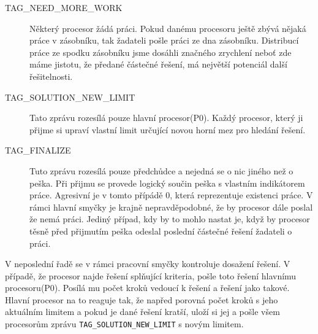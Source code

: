 \documentclass[12pt]{article}
\begin{document}
\begin{description}
  \item [TAG\_NEED\_MORE\_WORK] Některý procesor žádá práci. Pokud danému 
procesoru ještě zbývá nějaká práce v zásobníku, tak žadateli pošle práci ze 
dna zásobníku. Distribucí práce ze spodku zásobníku jsme dosáhli značného 
zrychlení neboť zde máme jistotu, že předané částečné řešení, má největší
potenciál další řešitelnosti.
  \item [TAG\_SOLUTION\_NEW\_LIMIT] Tato zprávu rozesílá pouze hlavní
procesor(P0). Každý procesor, který ji přijme si upraví vlastní limit určující
novou horní mez pro hledání řešení. 
  \item [TAG\_FINALIZE] Tuto zprávu rozesílá pouze předchůdce a nejedná
se o nic jiného než o peška. Při přijmu se provede logický součin peška s
vlastním indikátorem práce. Agresivní je v tomto přípádě 0, která reprezentuje
existenci práce. V rámci hlavní smyčky je krajně nepravděpodobné, že by procesor
dále poslal že nemá práci. Jediný případ, kdy by to mohlo nastat je, když by
procesor těsně před přijmutím peška odeslal poslední částečné řešení žadateli o
práci.
\end{description}
V neposlední řadě se v rámci pracovní smyčky kontroluje dosažení řešení. V
případě, že procesor najde řešení splňující kriteria, pošle toto řešení hlavnímu
procesoru(P0). Posílá mu počet kroků vedoucí k řešení a řešení jako takové.
Hlavní procesor na to reaguje tak, že napřed porovná počet kroků s jeho
aktuálním limitem a pokud je dané řešení kratší, uloží si jej a pošle všem
procesorům zprávu \verb|TAG_SOLUTION_NEW_LIMIT| s novým limitem.
\end{document}
